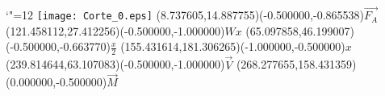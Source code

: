\documentclass[12pt]{article}
\begin{document}
\makeatletter%
\let\ASYencoding\f@encoding%
\let\ASYfamily\f@family%
\let\ASYseries\f@series%
\let\ASYshape\f@shape%
\makeatother%
{\catcode`"=12%
\texttt{[image: Corte\_0.eps]}%
}%
\kern -284.527559pt%
\color{ASYcolor}
\fontsize{12.000000}{14.400000}\selectfont
\usefont{\ASYencoding}{\ASYfamily}{\ASYseries}{\ASYshape}%
\ASYalign(8.737605,14.887755)(-0.500000,-0.865538){$\vec{F_A}$}%
\color{ASYcolor}
\fontsize{12.000000}{14.400000}\selectfont
\ASYalign(121.458112,27.412256)(-0.500000,-1.000000){$W x$}%
\color{ASYcolor}
\fontsize{12.000000}{14.400000}\selectfont
\ASYalign(65.097858,46.199007)(-0.500000,-0.663770){$\frac{x}{2}$}%
\color{ASYcolor}
\fontsize{12.000000}{14.400000}\selectfont
\ASYalign(155.431614,181.306265)(-1.000000,-0.500000){$x$}%
\color{ASYcolor}
\fontsize{12.000000}{14.400000}\selectfont
\ASYalign(239.814644,63.107083)(-0.500000,-1.000000){$\vec{V}$}%
\color{ASYcolor}
\fontsize{12.000000}{14.400000}\selectfont
\ASYalign(268.277655,158.431359)(0.000000,-0.500000){$\vec{M}$}%
\end{document}
